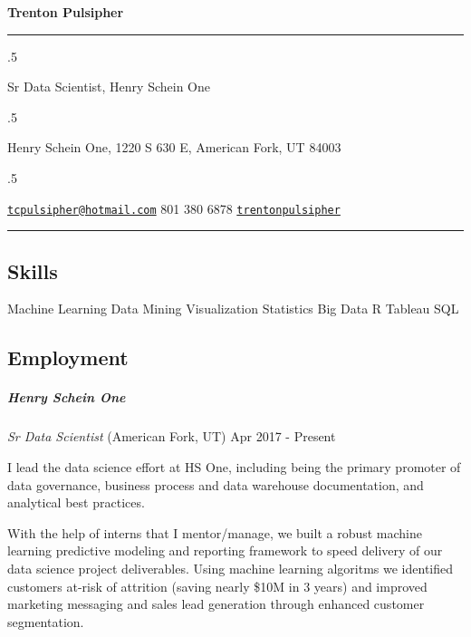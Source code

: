 \documentclass[11pt,]{article}
\let\oldsubparagraph\subparagraph
\renewcommand{\subparagraph}[1]{\oldsubparagraph{#1}\mbox{}}
\begin{document}
\centerline{\huge \bf Trenton Pulsipher}

\vspace{2 mm}

\hrule

\vspace{2 mm}

\moveleft.5\hoffset\centerline{Sr Data Scientist, Henry Schein One}
\moveleft.5\hoffset\centerline{Henry Schein One, 1220 S 630 E, American Fork, UT 84003}
\moveleft.5\hoffset\centerline{ \faEnvelopeO \hspace{1 mm} \href{mailto:}{\tt \href{mailto:tcpulsipher@hotmail.com}{\nolinkurl{tcpulsipher@hotmail.com}}} \hspace{1 mm}  \faPhone \hspace{1 mm}  801 380 6878  \hspace{1 mm}  \faGithub \hspace{1 mm} \href{http://github.com/trentonpulsipher}{\tt trentonpulsipher} \hspace{1 mm}     }

\vspace{2 mm}

\hrule


\subsection{Skills}\label{skills}

Machine Learning \textbar{} Data Mining \textbar{} Visualization
\textbar{} Statistics \textbar{} Big Data \textbar{} R \textbar{}
Tableau \textbar{} SQL

\subsection{Employment}\label{employment}

\subparagraph{Henry Schein One}\label{henry-schein-one}

\emph{Sr Data Scientist} (American Fork, UT) \hfill Apr 2017 - Present

I lead the data science effort at HS One, including being the primary
promoter of data governance, business process and data warehouse
documentation, and analytical best practices.

With the help of interns that I mentor/manage, we built a robust machine
learning predictive modeling and reporting framework to speed delivery
of our data science project deliverables. Using machine learning
algoritms we identified customers at-risk of attrition (saving nearly
\$10M in 3 years) and improved marketing messaging and sales lead
generation through enhanced customer segmentation.
\end{document}
